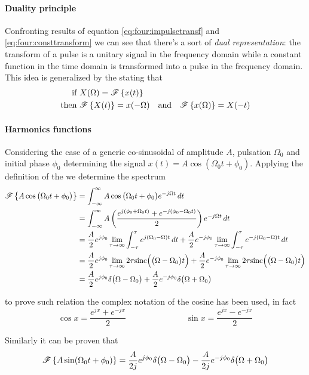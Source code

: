 	\paragraph{Duality principle} Confronting results of equation \ref{eq:four:impulsetransf} and \ref{eq:four:consttransform} we can see that there's a sort of \textit{dual representation}: the transform of a pulse is a unitary signal in the frequency domain while a constant function in the time domain is transformed into a pulse in the frequency domain. This idea is generalized by the  stating that
	\begin{align*}
		\textrm{if } & X(\Omega) = \mathscr{F}\left\{ x(t) \right\} \\
		\textrm{then }& \mathscr{F}\left\{ X(t) \right\} = x(-\Omega) \quad \textrm{and} \quad \mathscr{F}\left\{ x(\Omega) \right\} = X(-t)
	\end{align*}
	
	\paragraph{Harmonics functions} Considering the case of a generic co-sinusoidal of amplitude $A$, pulsation $\Omega_0$ and initial phase $\phi_0$ determining the signal $x(t) = A \cos(\Omega_0t+\phi_0)$. Applying the definition of the \ctft we determine the spectrum
	\begin{equation}
	\begin{aligned}
		\mathscr{F}\left\{ A \cos\big(\Omega_0 t + \phi_0\big) \right\} & = \int_{-\infty}^\infty A  \cos\big(\Omega_0 t + \phi_0\big) e^{-j\Omega t} \, dt \\ 
		& = \int_{-\infty}^\infty A \left( \frac{e^{j(\phi_0 + \Omega_0 t)} + e^{-j(\phi_0 - \Omega_0t)} }{2} \right) e^{-j\Omega t}\, dt \\
		& = \frac A 2 e^{j\phi_0} \lim_{\tau\rightarrow\infty} \int_{-\tau}^\tau e^{j(\Omega_0-\Omega)t}\, dt + \frac A 2 e^{-j\phi_0} \lim_{\tau\rightarrow\infty} \int_{-\tau}^\tau e^{-j(\Omega_0-\Omega)t}\, dt \\
		& = \frac A 2 e^{j\phi_0} \lim_{\tau\rightarrow\infty} 2\tau \textrm{sinc}\Big(\big(\Omega-\Omega_0\big)t\Big) + \frac A 2 e^{-j\phi_0} \lim_{\tau\rightarrow\infty} 2\tau \textrm{sinc}\Big(\big(\Omega-\Omega_0\big)t\Big) \\
		& = \frac A 2 e^{j\phi_0} \delta\big(\Omega - \Omega_0\big) + \frac A 2 e^{-j\phi_0} \delta\big(\Omega + \Omega_0\big)
	\end{aligned}
	\end{equation}
	\begin{note}
		to prove such relation the complex notation of the cosine has been used, in fact
		\[ \cos x = \frac{e^{jx} + e^{-jx}}{2} \hspace{3cm} \sin x = \frac{e^{jx} - e^{-jx}}{2} \]
	\end{note} \noindent
	Similarly it can be proven that
	\[ \mathscr{F}\left\{ A \sin(\Omega_0 t + \phi_0) \right\} = \frac A {2j} e^{j\phi_0} \delta\big(\Omega - \Omega_0\big) - \frac A {2j} e^{-j\phi_0} \delta\big(\Omega + \Omega_0\big) \]
	
